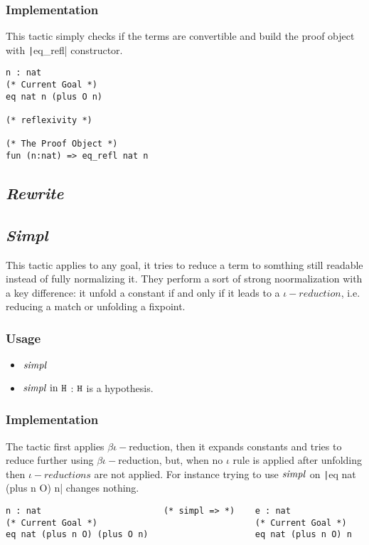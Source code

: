 \subsubsection*{Implementation}
This tactic simply checks if the terms are convertible and build the proof object with \texttt|eq_refl| constructor.

\begin{center}
\begin{minipage}{0.7\textwidth}
\begin{verbatim}
n : nat
(* Current Goal *)  
eq nat n (plus O n)   

(* reflexivity *)

(* The Proof Object *)
fun (n:nat) => eq_refl nat n
\end{verbatim}
\end{minipage}
\end{center}

\subsection{\it Rewrite}

\subsection{\it Simpl}
This tactic applies to any goal, it tries to reduce a term to somthing still readable instead of fully normalizing it. They perform a sort of strong noormalization with a key difference:
it unfold a constant if and only if it leads to a $\iota-reduction$, i.e. reducing a match or unfolding a fixpoint.


\subsubsection*{Usage}
\begin{itemize}
\item ${\it simpl}$
\item ${\it simpl}\ \rm in\ \tt H$ : $\tt H$ is a hypothesis.
\end{itemize}

\subsubsection*{Implementation}

The tactic first applies $\beta\iota-$reduction, then it expands constants and tries to reduce further using $\beta\iota-$reduction, but, when no $\iota$ rule is applied after unfolding
then $\iota-reductions$ are not applied. For instance trying to use $\it simpl$ on \texttt|eq nat (plus n O) n| changes nothing.
\begin{center}
\begin{minipage}{0.7\textwidth}
\begin{verbatim}
n : nat                        (* simpl => *)    e : nat
(* Current Goal *)                               (* Current Goal *)
eq nat (plus n O) (plus O n)                     eq nat (plus n O) n
\end{verbatim}
\end{minipage}
\end{center}

